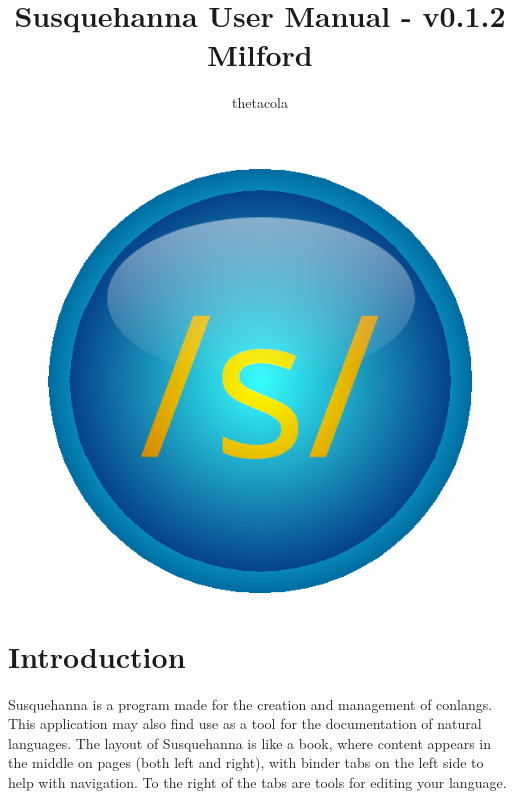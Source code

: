 \documentclass{report}
\title{Susquehanna User Manual - v0.1.2 Milford}
\author{thetacola}
\begin{document}
	\begin{figure}
		\centering
		\includegraphics[width=0.7\linewidth]{img/logo}
	\end{figure}
	\maketitle
	\tableofcontents
	\chapter{Introduction}
	Susquehanna is a program made for the creation and management of conlangs. This application may also find use as a tool for the documentation of natural languages. The layout of Susquehanna is like a book, where content appears in the middle on pages (both left and right), with binder tabs on the left side to help with navigation. To the right of the tabs are tools for editing your language.
\end{document}
